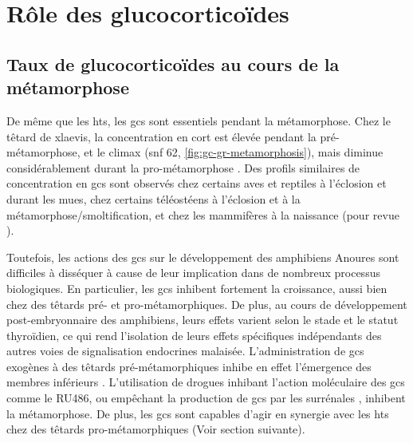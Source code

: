 \documentclass[../main.tex]{subfiles}
\begin{document}


\section{Rôle des glucocorticoïdes}

	\subsection{Taux de glucocorticoïdes au cours de la métamorphose}

		De même que les \glspl{ht}, les \glspl{gc} sont essentiels pendant la métamorphose.
		Chez le têtard de \gls{xlaevis}, la concentration en \gls{cort} est élevée pendant la pré-métamorphose, et le climax (\gls{snf} 62, \autoref{fig:gc-gr-metamorphosis}), mais diminue considérablement durant la pro-métamorphose \citep{JolivetJaudet1984,Kloas1997}.
		Des profils similaires de concentration en \glspl{gc} sont observés chez certains aves et reptiles à l'éclosion et durant les mues, chez certains téléostéens à l'éclosion et à la métamorphose/smoltification, et chez les mammifères à la naissance (pour revue \citealp{Wada2008}).

		

		Toutefois, les actions des \glspl{gc} sur le développement des amphibiens Anoures sont difficiles à disséquer à cause de leur implication dans de nombreux processus biologiques.
		En particulier, les \glspl{gc} inhibent fortement la croissance, aussi bien chez des têtards pré- et pro-métamorphiques.
		De plus, au cours de développement post-embryonnaire des amphibiens, leurs effets varient selon le stade et le statut thyroïdien, ce qui rend l'isolation de leurs effets spécifiques indépendants des autres voies de signalisation endocrines malaisée.
		L'administration de \glspl{gc} exogènes à des têtards pré-métamorphiques inhibe en effet l'émergence des membres inférieurs \citep{Kobayashi1958}.
		L'utilisation de drogues inhibant l'action moléculaire des \glspl{gc} comme le RU486, ou empêchant la production de \glspl{gc} par les surrénales \citep{Kikuyama1982}, inhibent la métamorphose.
		De plus, les \glspl{gc} sont capables d'agir en synergie avec les \glspl{ht} chez des têtards pro-métamorphiques \citep{Hayes1993a,Hayes1994,Gray1990} (Voir section suivante).
\end{document}
